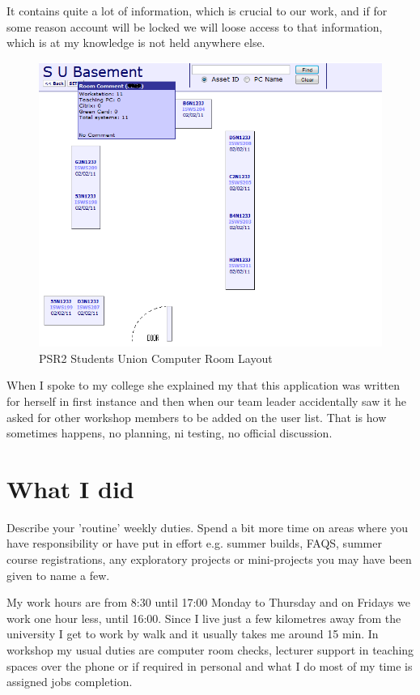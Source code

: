 \documentclass[10pt,a4paper,headinclude=true]{report}
\begin{document}
 It contains quite a lot of information, which is crucial to our work, and if for some reason account will be locked we will loose access to that information, which is at my knowledge is not held anywhere else.

\begin{figure}[H]
\includegraphics[scale=0.5]{./PSR2_SU_Room_layout}
\caption{PSR2 Students Union Computer Room Layout}
\label{fig:PSR2_SU_Room_layout}
\end{figure}

When I spoke to my college she explained my that this application was written for herself in first instance and then when our team leader accidentally saw it he asked for other workshop members to be added on the user list. That is how sometimes happens, no planning, ni testing, no official discussion.
\chapter{What I did}
Describe your 'routine' weekly duties. Spend a bit more time on areas where you have
responsibility or have put in effort e.g. summer builds, FAQS, summer course
registrations, any exploratory projects or mini-projects you may have been given to
name a few.

My work hours are from 8:30 until 17:00 Monday to Thursday and on Fridays we work one hour less, until 16:00. Since I live just a few kilometres away from the university I get to work by walk and it usually takes me around 15 min. In workshop my usual duties are computer room checks, lecturer support in teaching spaces over the phone or if required in personal and what I do most of my time is assigned jobs completion.
\end{document}
